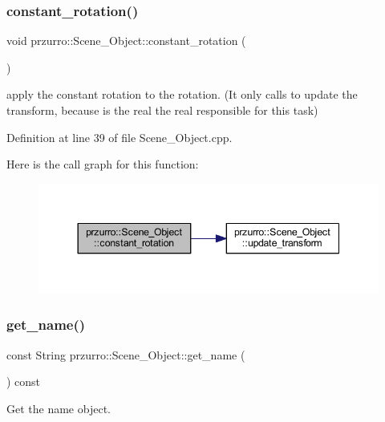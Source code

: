 \subsubsection{\texorpdfstring{constant\_rotation()}{constant\_rotation()}}
{\footnotesize\ttfamily void przurro\+::\+Scene\+\_\+\+Object\+::constant\+\_\+rotation (\begin{DoxyParamCaption}{ }\end{DoxyParamCaption})}



apply the constant rotation to the rotation. (It only calls to update the transform, because is the real the real responsible for this task) 



Definition at line 39 of file Scene\+\_\+\+Object.\+cpp.

Here is the call graph for this function\+:
\nopagebreak
\begin{figure}[H]
\begin{center}
\leavevmode
\includegraphics[width=344pt]{d9/d84/classprzurro_1_1_scene___object_a219f3f9d5543ae2b40d4d623ae61b0ce_cgraph}
\end{center}
\end{figure}
\mbox{\label{classprzurro_1_1_scene___object_a0814cf5dfa401ec825fc99dc4e38cfa8}} 
\subsubsection{\texorpdfstring{get\_name()}{get\_name()}}
{\footnotesize\ttfamily const String przurro\+::\+Scene\+\_\+\+Object\+::get\+\_\+name (\begin{DoxyParamCaption}{ }\end{DoxyParamCaption}) const\hspace{0.3cm}{\ttfamily [inline]}}



Get the name object. 

